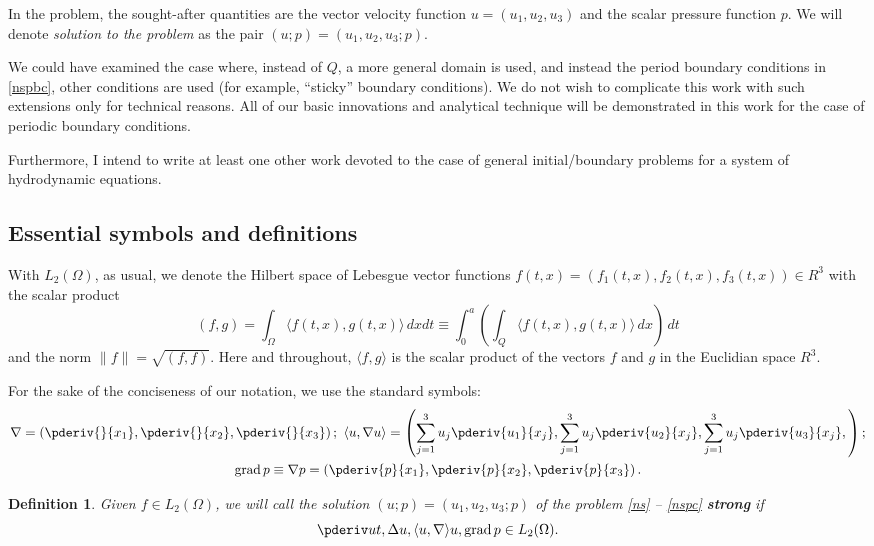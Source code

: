 \documentclass{article}
\DeclareMathOperator{\grad}{grad}
\numberwithin{equation}{section}
\newtheorem{defn}{Definition}
\begin{document}
In the problem, the sought-after quantities are the vector velocity function $u
= (u_1, u_2, u_3)$ and the scalar pressure function $p$. We will denote \emph{solution to
the problem} as the pair $(u;p) = (u_1, u_2, u_3; p)$.

We could have examined the case where, instead of $Q$, a more general domain
is used, and instead the period boundary conditions in \eqref{nspbc}, other
conditions are used (for example, ``sticky'' boundary conditions). We do not
wish to complicate this work with such extensions only for technical reasons.
All of our basic innovations and analytical technique will be demonstrated in
this work for the case of periodic boundary conditions.

Furthermore, I intend to write at least one other work devoted to the case of
general initial/boundary problems for a system of hydrodynamic equations.

\subsection{Essential symbols and definitions}

With $L_2(\Omega)$, as usual, we denote the Hilbert space of Lebesgue vector
functions $f(t,x) = (f_1(t,x), f_2(t,x), f_3(t,x)) \in R^3$ with the scalar product
\[
    (f,g) = \int_{\Omega} \langle f(t,x), g(t,x)\rangle\, dx dt \equiv
    \int_0^a\left( \int_Q\langle f(t,x), g(t,x)\rangle\,dx \right)\, dt
\]
and the norm $\lVert f \rVert = \sqrt{ (f, f) }$. Here and throughout,
$\langle f, g \rangle$ is the scalar product of the vectors $f$ and $g$ in the
Euclidian space $R^3$.

For the sake of the conciseness of our notation, we use the standard symbols:
\begin{gather*}
    \nabla = \left(\pderiv{}{x_1}, \pderiv{}{x_2}, \pderiv{}{x_3}\right);\ 
    \langle u, \nabla u \rangle = \left(
        \sum_{j=1}^3u_j\pderiv{u_1}{x_j},
        \sum_{j=1}^3u_j\pderiv{u_2}{x_j},
        \sum_{j=1}^3u_j\pderiv{u_3}{x_j},
    \right);\\
    \grad p \equiv \nabla p = \left(\pderiv{p}{x_1}, \pderiv{p}{x_2},
    \pderiv{p}{x_3}\right).
\end{gather*}

\begin{defn}
    Given $f\in L_2(\Omega)$, we will call the solution $(u;p) = (u_1, u_2, u_3; p)$
    of the problem \eqref{ns} -- \eqref{nspc} \textbf{strong} if
    \[
        \pderiv u t, \Delta u, \langle u, \nabla \rangle u, \grad p \in L_2(\Omega).
    \]
\end{defn}
\end{document}
